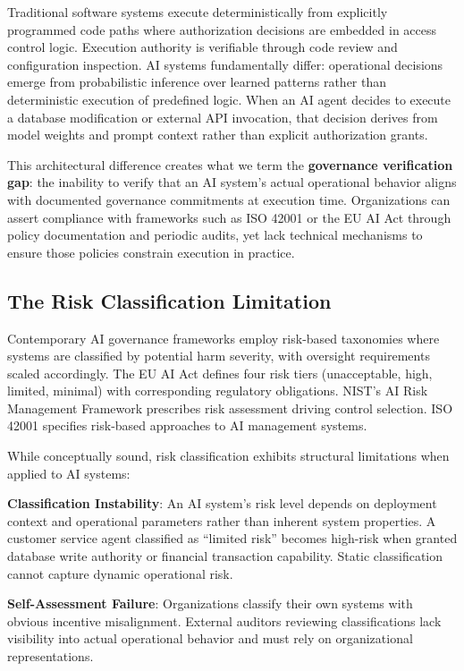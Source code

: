 \documentclass[11pt,letterpaper]{article}
\begin{document}
Traditional software systems execute deterministically from explicitly programmed code paths where authorization decisions are embedded in access control logic. Execution authority is verifiable through code review and configuration inspection. AI systems fundamentally differ: operational decisions emerge from probabilistic inference over learned patterns rather than deterministic execution of predefined logic. When an AI agent decides to execute a database modification or external API invocation, that decision derives from model weights and prompt context rather than explicit authorization grants.

This architectural difference creates what we term the \textbf{governance verification gap}: the inability to verify that an AI system's actual operational behavior aligns with documented governance commitments at execution time. Organizations can assert compliance with frameworks such as ISO 42001 or the EU AI Act through policy documentation and periodic audits, yet lack technical mechanisms to ensure those policies constrain execution in practice.

\subsection{The Risk Classification Limitation}

Contemporary AI governance frameworks employ risk-based taxonomies where systems are classified by potential harm severity, with oversight requirements scaled accordingly. The EU AI Act defines four risk tiers (unacceptable, high, limited, minimal) with corresponding regulatory obligations. NIST's AI Risk Management Framework prescribes risk assessment driving control selection. ISO 42001 specifies risk-based approaches to AI management systems.

While conceptually sound, risk classification exhibits structural limitations when applied to AI systems:

\textbf{Classification Instability}: An AI system's risk level depends on deployment context and operational parameters rather than inherent system properties. A customer service agent classified as ``limited risk'' becomes high-risk when granted database write authority or financial transaction capability. Static classification cannot capture dynamic operational risk.

\textbf{Self-Assessment Failure}: Organizations classify their own systems with obvious incentive misalignment. External auditors reviewing classifications lack visibility into actual operational behavior and must rely on organizational representations.
\end{document}
